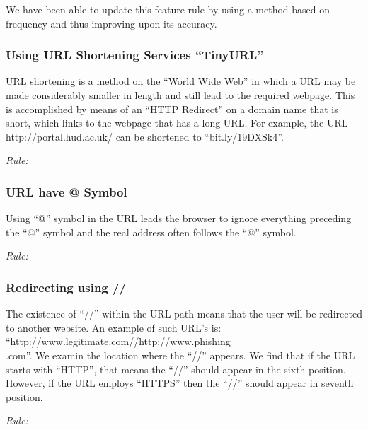 \documentclass[twocolumn,10pt]{article}
\begin{document}
We have been able to update this feature rule by using a method based on frequency and thus improving upon its accuracy.
\subsubsection{Using URL Shortening Services “TinyURL”}

URL shortening is a method on the “World Wide Web” in which a URL may be made considerably smaller in length and still lead to the required webpage. This is accomplished by means of an “HTTP Redirect” on a domain name that is short, which links to the webpage that has a long URL. For example, the URL http://portal.hud.ac.uk/ can be shortened to “bit.ly/19DXSk4”.
\begin{center}
\it Rule:
\end{center}
\subsubsection{URL have @ Symbol}
Using “@” symbol in the URL leads the browser to ignore everything preceding the “@” symbol and the real address often follows the “@” symbol. 
\begin{center}
\it Rule:
\end{center}
\subsubsection{Redirecting using //}

The existence of “//” within the URL path means that the user will be redirected to another website. An example of such URL’s is: “http://www.legitimate.com//http://www.phishing\\.com”. We examin the location where the “//” appears. We find that if the URL starts with “HTTP”, that means the “//” should appear in the sixth position. However, if the URL employs “HTTPS” then the “//” should appear in seventh position.
\begin{center}
\it Rule:
\end{center}
\end{document}
